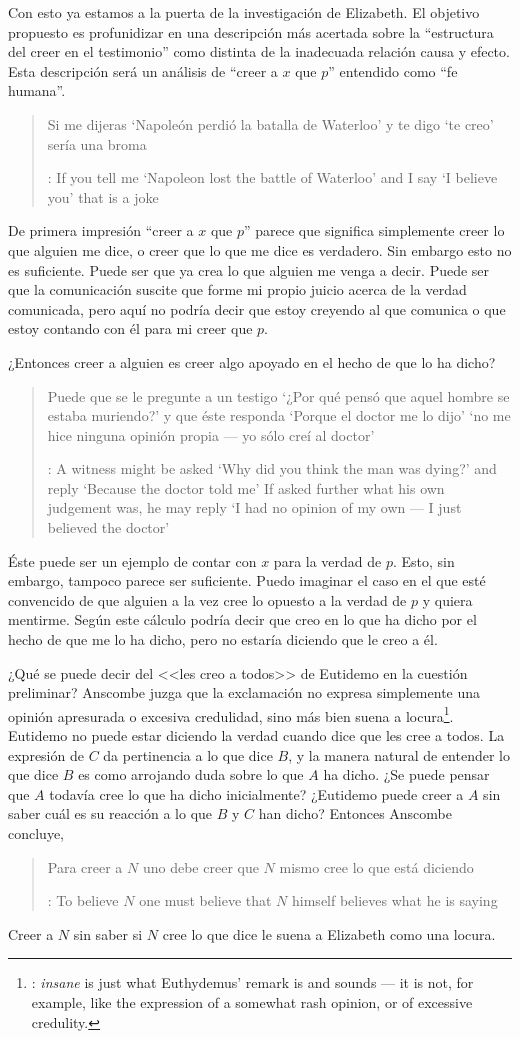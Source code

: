 Con esto ya estamos a la puerta de la investigación de Elizabeth. El objetivo propuesto es profunidizar en una descripción más acertada sobre la \enquote{estructura del creer en el testimonio} como distinta de la inadecuada relación causa y efecto. Esta descripción será un análisis de \enquote{creer a $x$ que $p$} entendido como \enquote{fe humana}.

\blockquote[{\cite[4]{anscombe2008faith:tobelieve}}: If you tell me `Napoleon lost the battle of Waterloo' and I say `I believe you' that is a joke]{Si me dijeras `Napoleón perdió la batalla de Waterloo' y te digo `te creo' sería una broma}. De primera impresión \enquote{creer a $x$ que $p$} parece que significa simplemente creer lo que alguien me dice, o creer que lo que me dice es verdadero. Sin embargo esto no es suficiente. Puede ser que ya crea lo que alguien me venga a decir. Puede ser que la comunicación suscite que forme mi propio juicio acerca de la verdad comunicada, pero aquí no podría decir que estoy creyendo al que comunica o que estoy contando con él para mi creer que $p$.

¿Entonces creer a alguien es creer algo apoyado en el hecho de que lo ha dicho? \blockquote[{\cite[4]{anscombe2008faith:tobelieve}}: A witness might be asked `Why did you think the man was dying?' and reply `Because the doctor told me' \textelp{} If asked further what his own judgement was, he may reply `I had no opinion of my own --- I just believed the doctor']{Puede que se le pregunte a un testigo `¿Por qué pensó que aquel hombre se estaba muriendo?' y que éste responda `Porque el doctor me lo dijo' \textelp{} `no me hice ninguna opinión propia --- yo sólo creí al doctor'}. Éste puede ser un ejemplo de contar con $x$ para la verdad de $p$. Esto, sin embargo, tampoco parece ser suficiente. Puedo imaginar el caso en el que esté convencido de que alguien a la vez cree lo opuesto a la verdad de $p$ y quiera mentirme. Según este cálculo podría decir que creo en lo que ha dicho por el hecho de que me lo ha dicho, pero no estaría diciendo que le creo a él.

¿Qué se puede decir del <<les creo a todos>> de Eutidemo en la cuestión preliminar? Anscombe juzga que la exclamación no expresa simplemente una opinión apresurada o excesiva credulidad, sino más bien suena a locura\footnote{\cite[Cf.~][5]{anscombe2008faith:tobelieve}: \emph{insane} is just what Euthydemus' remark is and sounds --- it is not, for example, like the expression of a somewhat rash opinion, or of excessive credulity.}. Eutidemo no puede estar diciendo la verdad cuando dice que les cree a todos. La expresión de $C$ da pertinencia a lo que dice $B$, y la manera natural de entender lo que dice $B$ es como arrojando duda sobre lo que $A$ ha dicho. ¿Se puede pensar que $A$ todavía cree lo que ha dicho inicialmente? ¿Eutidemo puede creer a $A$ sin saber cuál es su reacción a lo que $B$ y $C$ han dicho? Entonces Anscombe concluye, \blockquote[{\cite[5]{anscombe2008faith:tobelieve}}: To believe $N$ one must believe that $N$ himself believes what he is saying]{Para creer a $N$ uno debe creer que $N$ mismo cree lo que está diciendo} Creer a $N$ sin saber si $N$ cree lo que dice le suena a Elizabeth como una locura.

